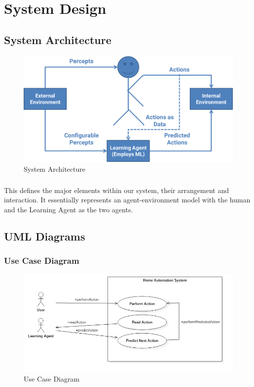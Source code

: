 \chapter{System Design}


\section{System Architecture}

	\begin{figure}[h]
		\includegraphics[width=\textwidth]{./Chapter5/system-architecture}
			\caption{System Architecture}
	\end{figure}
	\paragraph{}
	This defines the major elements within our system, their arrangement and interaction. It essentially represents an agent-environment model with the human and the Learning Agent as the two agents.

\section{UML Diagrams}

	\subsection{Use Case Diagram}
	\begin{figure}[H]
	\centering
	\includegraphics[width=\textwidth]{./Chapter5/UseCaseDiagram}
		\caption{Use Case Diagram}
	\end{figure}
